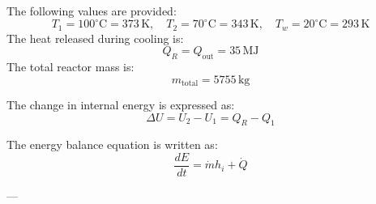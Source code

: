 The following values are provided:  
\[
T_1 = 100^\circ\text{C} = 373 \, \text{K}, \quad T_2 = 70^\circ\text{C} = 343 \, \text{K}, \quad T_w = 20^\circ\text{C} = 293 \, \text{K}
\]  
The heat released during cooling is:  
\[
Q_R = Q_{\text{out}} = 35 \, \text{MJ}
\]  
The total reactor mass is:  
\[
m_{\text{total}} = 5755 \, \text{kg}
\]  

The change in internal energy is expressed as:  
\[
\Delta U = U_2 - U_1 = Q_R - Q_1
\]  

The energy balance equation is written as:  
\[
\frac{dE}{dt} = \dot{m} h_i + \dot{Q}
\]  

---